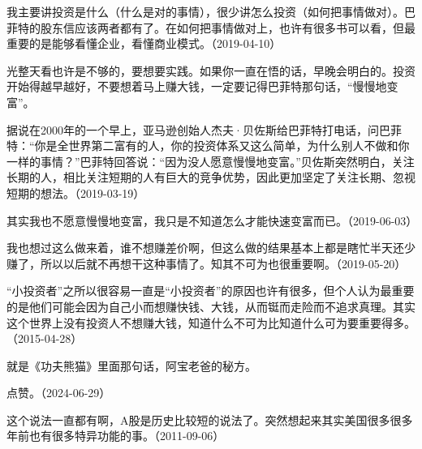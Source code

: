
我主要讲投资是什么（什么是对的事情），很少讲怎么投资（如何把事情做对）。巴菲特的股东信应该两者都有了。在如何把事情做对上，也许有很多书可以看，但最重要的是能够看懂企业，看懂商业模式。（2019-04-10）

光整天看也许是不够的，要想要实践。如果你一直在悟的话，早晚会明白的。投资开始得越早越好，不要想着马上赚大钱，一定要记得巴菲特那句话，“慢慢地变富”。

据说在2000年的一个早上，亚马逊创始人杰夫·贝佐斯给巴菲特打电话，问巴菲特：“你是全世界第二富有的人，你的投资体系又这么简单，为什么别人不做和你一样的事情？”巴菲特回答说：“因为没人愿意慢慢地变富。”贝佐斯突然明白，关注长期的人，相比关注短期的人有巨大的竞争优势，因此更加坚定了关注长期、忽视短期的想法。（2019-03-19）


其实我也不愿意慢慢地变富，我只是不知道怎么才能快速变富而已。（2019-06-03）


我也想过这么做来着，谁不想赚差价啊，但这么做的结果基本上都是瞎忙半天还少赚了，所以以后就不再想干这种事情了。知其不可为也很重要啊。（2019-05-20）

“小投资者”之所以很容易一直是“小投资者”的原因也许有很多，但个人认为最重要的是他们可能会因为自己小而想赚快钱、大钱，从而铤而走险而不追求真理。其实这个世界上没有投资人不想赚大钱，知道什么不可为比知道什么可为要重要得多。（2015-04-28）


就是《功夫熊猫》里面那句话，阿宝老爸的秘方。


点赞。（2024-06-29）


这个说法一直都有啊，A股是历史比较短的说法了。突然想起来其实美国很多很多年前也有很多特异功能的事。（2011-09-06）

